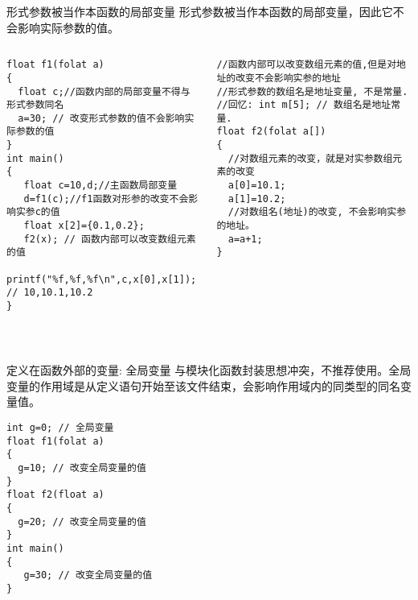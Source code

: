 \begin{frame}{形式参数被当作本函数的局部变量}
形式参数被当作本函数的局部变量，因此它不会影响实际参数的值。
\vspace{-0.3cm}
\begin{columns}[T]
\begin{lstlisting}
float f1(folat a) 
{
  float c;//函数内部的局部变量不得与形式参数同名
  a=30; // 改变形式参数的值不会影响实际参数的值
}
int main()
{
   float c=10,d;//主函数局部变量
   d=f1(c);//f1函数对形参的改变不会影响实参c的值
   float x[2]={0.1,0.2}; 
   f2(x); // 函数内部可以改变数组元素的值
   printf("%f,%f,%f\n",c,x[0],x[1]); // 10,10.1,10.2  
}
\end{lstlisting}
\begin{lstlisting}[frame=leftline]
//函数内部可以改变数组元素的值,但是对地址的改变不会影响实参的地址
//形式参数的数组名是地址变量, 不是常量.
//回忆: int m[5]; // 数组名是地址常量.
float f2(folat a[]) 
{
  //对数组元素的改变，就是对实参数组元素的改变
  a[0]=10.1;
  a[1]=10.2;
  //对数组名(地址)的改变, 不会影响实参的地址。
  a=a+1; 
}
\end{lstlisting}
\end{columns}
~\\
\end{frame}

\begin{frame}{定义在函数外部的变量: 全局变量}
与模块化函数封装思想冲突，不推荐使用。全局变量的作用域是从定义语句开始至该文件结束，会影响作用域内的同类型的同名变量值。 
\begin{lstlisting}
int g=0; // 全局变量
float f1(folat a) 
{
  g=10; // 改变全局变量的值
}
float f2(float a)
{ 
  g=20; // 改变全局变量的值
}
int main()
{
   g=30; // 改变全局变量的值
}
\end{lstlisting}
\end{frame}




